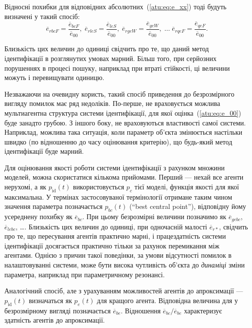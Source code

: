 Відносні похибки для відповідних абсолютних~(\ref{atu:eq:e_xx})
тоді будуть визначені у такий спосіб:
%
\begin{equation}
  \overline{e}_{rbcF} = \frac{\overline{e}_{bcF}}{\overline{e}_{00}}, \;
  \overline{e}_{rleS} = \frac{\overline{e}_{leS}}{\overline{e}_{00}}, \;
  \overline{e}_{rgeW} = \frac{\overline{e}_{geW}}{\overline{e}_{00}},
  \; \ldots \;
  \overline{e}_{rqeF} = \frac{\overline{e}_{qeF}}{\overline{e}_{00}}.
  \label{atu:eq:e_rxx}
\end{equation}

Близькість цих величин до одиниці свідчить про те, що даний метод ідентифікації
в розглянутих умовах марний. Більш того, при серйозних порушеннях в процесі
пошуку, наприклад при втраті стійкості, ці величини можуть і перевищувати
одиницю.

Незважаючи на очевидну користь, такий спосіб приведення до
безрозмірного вигляду помилок має ряд недоліків. По-перше,
не враховується можлива мультиагентна структура системи
ідентифікації, для якої оцінка~(\ref{atu:eq:e_00}) буде занадто
грубою. З іншого боку, не враховуються властивості самої
системи. Наприклад, можлива така ситуація, коли параметр об'єкта
змінюється настільки швидко (по відношенню до часу оцінювання
критерію), що будь-який метод ідентифікації буде марний.

Для оцінювання якості роботи системи ідентифікації з рахунком
множини моделей, можна скористатися кількома прийомами. Перший
--- нехай все агенти нерухомі, а як
$p_\mathrm{id}(t)$ використовується
$p_c$ тієї моделі, функція якості для якої максимальна. У термінах
застосовуваної термінології отримане таким чином значення
параметра позначається
$p_{bc}(t)$ (``best central point''), відповідну йому усереднену похибку як
$\overline{e}_{bc}$. При цьому безрозмірні величини позначимо як
$\overline{e}_{gebc}$,
$\overline{e}_{lebc}$, \ldots. Близькість цих величин до одиниці, при
одночасній малості
$\overline{e}_{r *}$, свідчить про те, що пересування агентів практично
марні, і працездатність системи ідентифікації досягається
практично тільки за рахунок перемикання між агентами. Однією
з причин такої поведінки, за умови відсутності помилок в
налаштовуванні системи, може бути висока чутливість об'єкта до
\textit{динаміці} зміни параметра, наприклад при параметричному
резонансі.

Аналогічний спосіб, але з урахуванням можливостей агентів до
апроксимації ---
$p_\mathrm{id}(t)$ визначаться як
$p_e(t)$ для кращого агента. Відповідна величина для
у безрозмірному вигляді позначається
$\overline{e}_{be}$. Відношення
$\overline{e}_{bc} / \overline{e}_{be}$ характеризує здатність
агентів до апроксимації.


